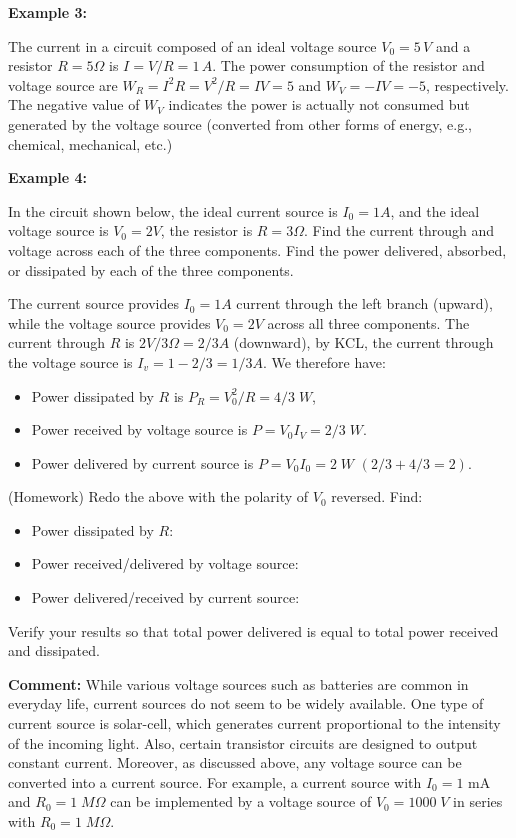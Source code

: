\begin{itemize}
{\bf Example 3:}

The current in a circuit composed of an ideal voltage source $V_0=5\,V$ 
and a resistor $R=5\Omega$ is $I=V/R=1\,A$. The power consumption of the
resistor and voltage source are $W_R=I^2R=V^2/R=IV=5$ and $W_V=-IV=-5$,
respectively. The negative value of $W_V$ indicates the power is actually
not consumed but generated by the voltage source (converted from other 
forms of energy, e.g., chemical, mechanical, etc.)

{\bf Example 4:} 
    
In the circuit shown below, the ideal current source is $I_0=1A$, and the 
ideal voltage source is $V_0=2V$, the resistor is $R=3\Omega$. Find the
current through and voltage across each of the three components. Find the 
power delivered, absorbed, or dissipated by each of the three components.


The current source provides $I_0=1A$ current through the left branch 
(upward), while the voltage source provides $V_0=2V$ across all three
components. The current through $R$ is $2V/3\Omega=2/3A$ (downward), 
by KCL, the current through the voltage source is $I_v=1-2/3=1/3A$. 
We therefore have:

\begin{itemize}
\item Power dissipated by $R$ is $P_R=V_0^2/R=4/3\;W$,
\item Power received by voltage source is $P=V_0I_V=2/3\;W$.
\item Power delivered by current source is $P=V_0I_0=2\;W$ $(2/3+4/3=2)$.
\end{itemize}

(Homework) Redo the above with the polarity of $V_0$ reversed. Find:
\begin{itemize}
\item Power dissipated by $R$: 
\item Power received/delivered by voltage source:
\item Power delivered/received by current source:
\end{itemize}
Verify your results so that total power delivered is equal to total
power received and dissipated.


{\bf Comment:} While various voltage sources such as batteries are common 
in everyday life, current sources do not seem to be widely available. One
type of current source is solar-cell, which generates current proportional
to the intensity of the incoming light. Also, certain transistor circuits
are designed to output constant current. Moreover, as discussed above, any
voltage source can be converted into a current source. For example, a 
current source with $I_0=1$ mA and $R_0=1\;M\Omega$ can be implemented
by a voltage source of $V_0=1000\; V$ in series with $R_0=1\;M\Omega$.



\end{itemize}
